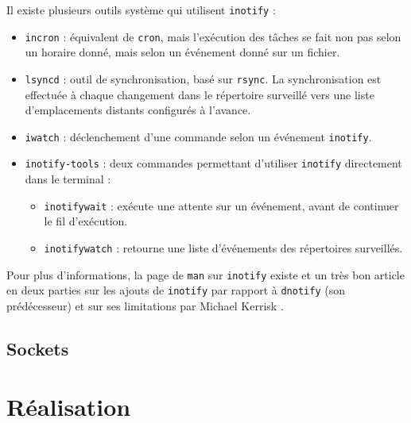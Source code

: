 \documentclass[a4paper, 12pt]{article}
\begin{document}
Il existe plusieurs outils système qui utilisent \texttt{inotify} \cite{ref30} :
\begin{itemize}
    \item \texttt{incron} : équivalent de \texttt{cron}, mais l'exécution 
        des tâches se fait non pas selon un horaire donné, mais selon un événement donné sur un fichier.
    \item \texttt{lsyncd} : outil de synchronisation, basé sur \texttt{rsync}. 
        La synchronisation est effectuée à chaque changement dans le répertoire surveillé vers une 
        liste d'emplacements distants configurés à l'avance.
    \item \texttt{iwatch} : déclenchement d'une commande selon un événement \texttt{inotify}.
    \item \texttt{inotify-tools} : deux commandes permettant d'utiliser \texttt{inotify} 
        directement dans le terminal :
        \begin{itemize}
            \item \texttt{inotifywait} : exécute une attente sur un événement, avant de 
                continuer le fil d'exécution.
            \item \texttt{inotifywatch} : retourne une liste d'événements des répertoires surveillés.
        \end{itemize}
\end{itemize}
Pour plus d'informations, la page de \texttt{man} sur \texttt{inotify} existe \cite{ref29} et 
un très bon article en deux parties sur les ajouts de \texttt{inotify} par rapport à \texttt{dnotify} 
(son prédécesseur) \cite{ref31} et sur ses limitations par Michael Kerrisk \cite{ref32}.

\subsection{Sockets}
\newpage


\section{Réalisation} %
\end{document}
